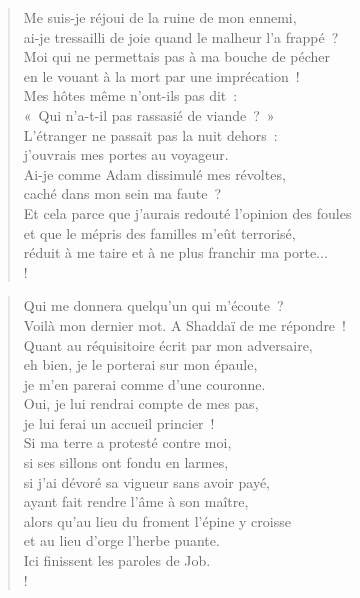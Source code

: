 \documentclass[french,twoside]{book} %
\def\mednobreak{\ifdim\lastskip<\medskipamount
  \removelastskip\nopagebreak\medskip\fi}
\newcommand{\labelblock}[1]{\medbreak{\noindent\color{rubric}\bfseries #1}\par\mednobreak}
\newcommand\chapterclose{} %
\begin{document}
\begin{verse}
Me suis-je réjoui de la ruine de mon ennemi, \\
ai-je tressailli de joie quand le malheur l’a frappé ?\\
Moi qui ne permettais pas à ma bouche de pécher \\
en le vouant à la mort par une imprécation !\\
Mes hôtes même n’ont-ils pas dit : \\
« Qui n’a-t-il pas rassasié de viande ? »\\
L’étranger ne passait pas la nuit dehors : \\
j’ouvrais mes portes au voyageur.\\
Ai-je comme Adam dissimulé mes révoltes, \\
caché dans mon sein ma faute ?\\
Et cela parce que j’aurais redouté l’opinion des foules \\
et que le mépris des familles m’eût terrorisé, \\
réduit à me taire et à ne plus franchir ma porte...\\!
\end{verse}

\labelblock{Le dernier défi}


\begin{verse}
Qui me donnera quelqu’un qui m’écoute ? \\
Voilà mon dernier mot. A Shaddaï de me répondre ! \\
Quant au réquisitoire écrit par mon adversaire,\\
eh bien, je le porterai sur mon épaule, \\
je m’en parerai comme d’une couronne.\\
Oui, je lui rendrai compte de mes pas, \\
je lui ferai un accueil princier !\\
Si ma terre a protesté contre moi, \\
si ses sillons ont fondu en larmes,\\
si j’ai dévoré sa vigueur sans avoir payé, \\
ayant fait rendre l’âme à son maître,\\
alors qu’au lieu du froment l’épine y croisse \\
et au lieu d’orge l’herbe puante. \\
Ici finissent les paroles de Job.\\!
\end{verse}
\chapterclose
\end{document}
